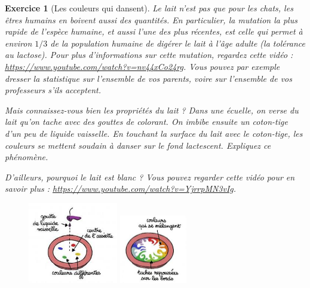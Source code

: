 \documentclass[12pt]{article}
\theoremstyle{break}
\newtheorem{exo}{Exercice}
\begin{document}
\begin{exo}[Les couleurs qui dansent]
Le lait n'est pas que pour les chats, les êtres humains en boivent aussi des quantités. En particulier, la mutation la plus rapide de l'espèce humaine, et aussi l'une des plus récentes, est celle qui permet à environ $1/3$ de la population humaine de digérer le lait à l'âge adulte (la tolérance au lactose). Pour plus d'informations sur cette mutation, regardez cette vidéo : \url{https://www.youtube.com/watch?v=nv44xCo24rg}. Vous pouvez par exemple dresser la statistique sur l'ensemble de vos parents, voire sur l'ensemble de vos professeurs s'ils acceptent.

Mais connaissez-vous bien les propriétés du lait ? Dans une écuelle, on verse du lait qu'on tache avec des gouttes de colorant. On imbibe ensuite un coton-tige d'un peu de liquide vaisselle. En touchant la surface du lait avec le coton-tige, les couleurs se mettent soudain à danser sur le fond lactescent. Expliquez ce phénomène.

D'ailleurs, pourquoi le lait est blanc ? Vous pouvez regarder cette vidéo pour en savoir plus : \url{https://www.youtube.com/watch?v=YjrrpMN3vIg}.

\begin{figure}[h!]
	\centering
    \includegraphics[width=0.35\textwidth]{LaitColorants.jpg}
    \includegraphics[width=0.26\textwidth]{LaitColorants2.jpg}
\end{figure}


\end{exo}
\end{document}
